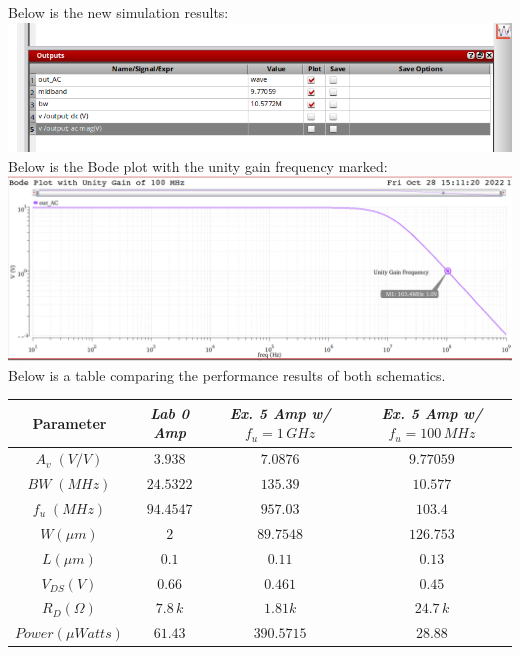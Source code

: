\documentclass[12pt, fleqn]{article}
\begin{document}
\newpage
Below is the new simulation results:\\[0.25cm]
\includegraphics[scale=0.375, center]{sim_res9.PNG}\\[0.25cm]
Below is the Bode plot with the unity gain frequency marked:\\[0.25cm]
\includegraphics[scale=0.275, center]{bode9.PNG}\\[0.25cm]
Below is a table comparing the performance results of both schematics.
    \begin{table}[H]
    \centering
    \setlength{\tabcolsep}{8pt}
    \renewcommand{\arraystretch}{1.5}
        \begin{tabular}{|c|c|c|c|}
            \hline
            \textbf{Parameter} & \textit{Lab 0 Amp} & \textit{Ex. 5 Amp w/} $f_u = 1\,GHz$ & \textit{Ex. 5 Amp w/} $f_u = 100\,MHz$\\
            \hline
            $A_v\;(V/V)$ & $3.938$ & $7.0876$ & $9.77059$\\
            \hline
            $BW\;(MHz)$ & $24.5322$ & $135.39$ & $10.577$\\
            \hline
            $f_u\;(MHz)$ & $94.4547$ & $957.03$ & $103.4$\\
            \hline
            $W (\mu m)$ & $2$ & $89.7548$ & $126.753$\\
            \hline
            $L (\mu m)$ & $0.1$ & $0.11$ & $0.13$\\
            \hline
            $V_{DS} (V)$ & $0.66$ & $0.461$ & $0.45$\\
            \hline
            $R_D (\Omega)$ & $7.8\,k$ & $1.81k$ & $24.7\,k$\\
            \hline
            $Power (\mu Watts)$ & $61.43$ & $390.5715$ & $28.88$\\
            \hline
        \end{tabular}
    \end{table}
\end{document}
